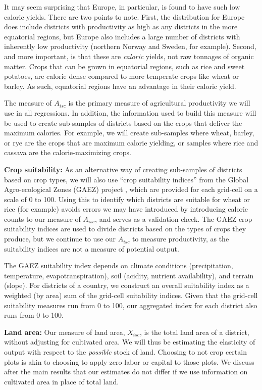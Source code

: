 \documentclass[11pt]{article}
\begin{document}
It may seem surprising that Europe, in particular, is found to have such low caloric yields. There are two points to note. First, the distribution for Europe does include districts with productivity as high as any districts in the more equatorial regions, but Europe also includes a large number of districts with inherently low productivity (northern Norway and Sweden, for example). Second, and more important, is that these are \textit{caloric} yields, not raw tonnages of organic matter. Crops that can be grown in equatorial regions, such as rice and sweet potatoes, are calorie dense compared to more temperate crops like wheat or barley. As such, equatorial regions have an advantage in their caloric yield. 

The measure of $A_{isc}$ is the primary measure of agricultural productivity we will use in all regressions. In addition, the information used to build this measure will be used to create sub-samples of districts based on the crops that deliver the maximum calories. For example, we will create sub-samples where wheat, barley, or rye are the crops that are maximum calorie yielding, or samples where rice and cassava are the calorie-maximizing crops.

\vspace{.5cm}\noindent\textbf{Crop suitability:} As an alternative way of creating sub-samples of districts based on crop types, we will also use ``crop suitability indices'' from the Global Agro-ecological Zones (GAEZ) project \citep{gaez}, which are provided for each grid-cell on a scale of 0 to 100. Using this to identify which districts are suitable for wheat or rice (for example) avoids errors we may have introduced by introducing calorie counts to our measure of $A_{isc}$, and serves as a validation check. The GAEZ crop suitability indices are used to divide districts based on the types of crops they produce, but we continue to use our $A_{isc}$ to measure productivity, as the suitability indices are not a measure of potential output.

The GAEZ suitability index depends on climate conditions (precipitation, temperature, evapotranspiration), soil (acidity, nutrient availability), and terrain (slope). For districts of a country, we construct an overall suitability index as a weighted (by area) sum of the grid-cell suitability indices. Given that the grid-cell suitability measures run from 0 to 100, our aggregated index for each district also runs from 0 to 100.

\vspace{.5cm}\noindent\textbf{Land area:} Our measure of land area, $X_{isc}$, is the total land area of a district, without adjusting for cultivated area. We will thus be estimating the elasticity of output with respect to the \textit{possible} stock of land. Choosing to not crop certain plots is akin to choosing to apply zero labor or capital to those plots. We discuss after the main results that our estimates do not differ if we use information on cultivated area in place of total land.
\end{document}
